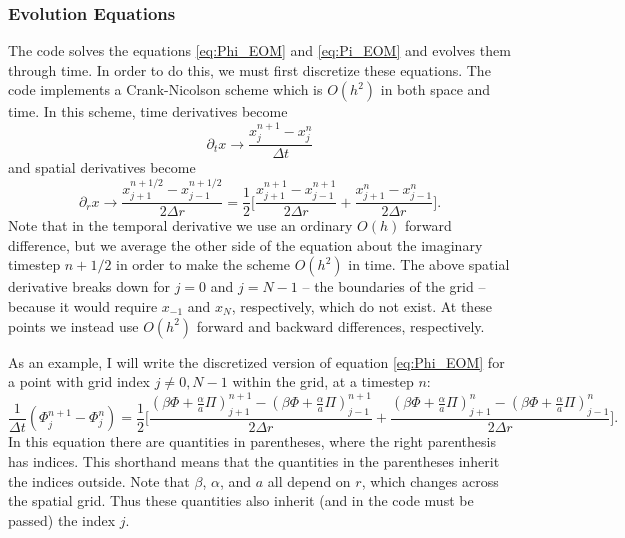 \documentclass[12pt]{article}
\numberwithin{equation}{section}
\begin{document}
\subsubsection{Evolution Equations}
The code solves the equations \ref{eq:Phi_EOM} and \ref{eq:Pi_EOM} and evolves them through time.  In order to do this, we must first discretize these equations.  The code implements a Crank-Nicolson scheme which is $O(h^2)$ in both space and time.  In this scheme, time derivatives become
\begin{equation}
\partial_t x \to \frac{x^{n+1}_j - x^{n}_j}{\Delta t}
\end{equation}
and spatial derivatives become
\begin{equation}
\partial_r x \to \frac{x^{n+1/2}_{j+1} - x^{n+1/2}_{j-1}}{2 \Delta r} = \frac{1}{2} \Big[ \frac{x^{n+1}_{j+1} - x^{n+1}_{j-1}}{2 \Delta r} + \frac{x^{n}_{j+1} - x^{n}_{j-1}}{2 \Delta r} \Big].
\end{equation}
Note that in the temporal derivative we use an ordinary $O(h)$ forward difference, but we average the other side of the equation about the imaginary timestep $n+1/2$ in order to make the scheme $O(h^2)$ in time.  The above spatial derivative breaks down for $j = 0$ and $j = N-1$ -- the boundaries of the grid -- because it would require $x_{-1}$ and $x_{N}$, respectively, which do not exist.  At these points we instead use $O(h^2)$ forward and backward differences, respectively.

As an example, I will write the discretized version of equation \ref{eq:Phi_EOM} for a point with grid index $j \neq 0, N-1$ within the grid, at a timestep $n$:
\begin{equation}
\frac{1}{\Delta t} (\Phi^{n+1}_j - \Phi^{n}_j) = \frac{1}{2} \Big[ \frac{(\beta \Phi + \frac{\alpha}{a} \Pi)^{n+1}_{j+1} - (\beta \Phi + \frac{\alpha}{a} \Pi)^{n+1}_{j-1}}{2 \Delta r} + \frac{(\beta \Phi + \frac{\alpha}{a} \Pi)^{n}_{j+1} - (\beta \Phi + \frac{\alpha}{a} \Pi)^{n}_{j-1}}{2 \Delta r} \Big].
\end{equation}
In this equation there are quantities in parentheses, where the right parenthesis has indices.  This shorthand means that the quantities in the parentheses inherit the indices outside.  Note that $\beta$, $\alpha$, and $a$ all depend on $r$, which changes across the spatial grid.  Thus these quantities also inherit (and in the code must be passed) the index $j$.
\end{document}
